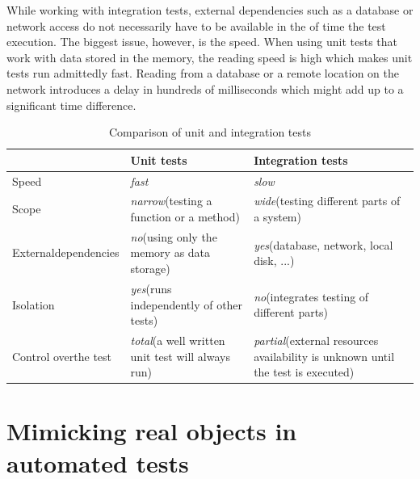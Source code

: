 \documentclass[
  print,
  table,
  nolof,
  nolot,
  nocover,
  oneside
]{fithesis3}
\begin{document}
While working with integration tests, external dependencies such as a database or network access do not necessarily have to be available in the of time the test execution. The biggest issue, however, is the speed. When using unit tests that work with data stored in the memory, the reading speed is high which makes unit tests run admittedly fast. Reading from a database or a remote location on the network introduces a delay in hundreds of milliseconds which might add up to a significant time difference. 
\begin{table}[!ht]
  \begin{tabularx}{\textwidth}{XXX}
    \toprule
     & Unit tests & Integration tests \\
    \midrule
    Speed & \textit{fast} & \textit{slow} \\
    Scope & \textit{narrow}\newline(testing a function or a method) & \textit{wide}\newline(testing different parts of a system) \\
    External\newline dependencies & \textit{no}\newline(using only the memory as data storage) & \textit{yes}\newline(database, network, local disk, ...) \\
    Isolation & \textit{yes}\newline(runs independently of other tests)& \textit{no}\newline(integrates testing of different parts) \\
    Control over\newline the test & \textit{total}\newline(a well written unit test will always run) & \textit{partial}\newline(external resources availability is unknown until the test is executed) \\
    \bottomrule
  \end{tabularx}
  \caption{Comparison of unit and integration tests}
  \label{tab:tests}
\end{table}


\section{Mimicking real objects in automated tests}
\label{mimicking real objects in automated tests}
\end{document}
